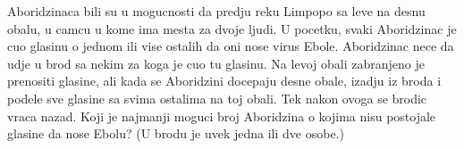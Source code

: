  Aboridzinaca bili su u mogucnosti da predju reku Limpopo sa leve na desnu obalu, u camcu u kome ima mesta za dvoje ljudi.
U pocetku, svaki Aboridzinac je cuo glasinu o jednom ili vise ostalih da oni nose virus Ebole.
Aboridzinac nece da udje u brod sa nekim za koga je cuo tu glasinu.
Na levoj obali zabranjeno je prenositi glasine, ali kada se Aboridzini docepaju desne obale, izadju iz broda i podele sve glasine sa svima ostalima na toj obali.
Tek nakon ovoga se brodic vraca nazad.
Koji je najmanji moguci broj Aboridzina o kojima nisu postojale glasine da nose Ebolu?
(U brodu je uvek jedna ili dve osobe.)
\solution
\endproblem
